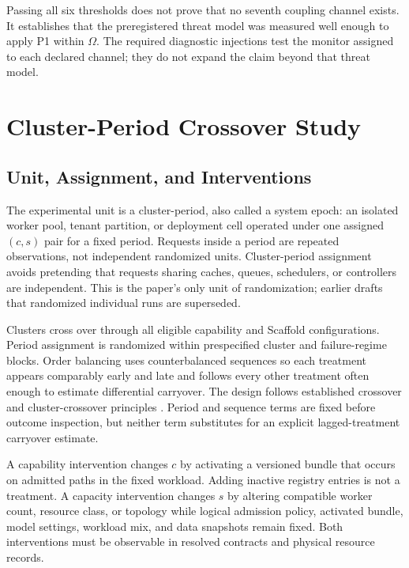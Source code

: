 \documentclass[11pt]{article}
\begin{document}
Passing all six thresholds does not prove that no seventh coupling channel exists. It establishes that the preregistered threat model was measured well enough to apply P1 within $\Omega$. The required diagnostic injections test the monitor assigned to each declared channel; they do not expand the claim beyond that threat model.

\section{Cluster-Period Crossover Study}
\label{sec:evaluation}

\subsection{Unit, Assignment, and Interventions}

The experimental unit is a cluster-period, also called a system epoch: an isolated worker pool, tenant partition, or deployment cell operated under one assigned $(c,s)$ pair for a fixed period. Requests inside a period are repeated observations, not independent randomized units. Cluster-period assignment avoids pretending that requests sharing caches, queues, schedulers, or controllers are independent. This is the paper's only unit of randomization; earlier drafts that randomized individual runs are superseded.

Clusters cross over through all eligible capability and Scaffold configurations. Period assignment is randomized within prespecified cluster and failure-regime blocks. Order balancing uses counterbalanced sequences so each treatment appears comparably early and late and follows every other treatment often enough to estimate differential carryover. The design follows established crossover and cluster-crossover principles \cite{jones2014crossover,turner2007cluster}. Period and sequence terms are fixed before outcome inspection, but neither term substitutes for an explicit lagged-treatment carryover estimate.

A capability intervention changes $c$ by activating a versioned bundle that occurs on admitted paths in the fixed workload. Adding inactive registry entries is not a treatment. A capacity intervention changes $s$ by altering compatible worker count, resource class, or topology while logical admission policy, activated bundle, model settings, workload mix, and data snapshots remain fixed. Both interventions must be observable in resolved contracts and physical resource records.
\end{document}
